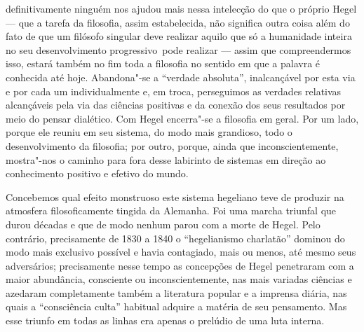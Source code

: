 definitivamente ninguém nos ajudou mais nessa intelecção do que o
próprio Hegel ---
que a tarefa da filosofia, assim estabelecida, não significa outra coisa
além do fato de que um filósofo singular deve realizar aquilo que só a
humanidade inteira no seu desenvolvimento progressivo\est\ pode realizar ---
assim que compreendermos isso, estará também no fim toda a filosofia no
sentido em que a palavra é conhecida até hoje. Abandona"-se a ``verdade
absoluta'', inalcançável por esta via e por cada um individualmente e,
em troca, perseguimos as verdades relativas alcançáveis pela via das
ciências positivas e da conexão dos seus resultados por meio do pensar
dialético.
Com Hegel
encerra"-se a filosofia em geral. Por um lado, porque ele reuniu em seu
sistema, do modo mais grandioso, todo o desenvolvimento da filosofia;
por outro, porque, ainda que inconscientemente, mostra"-nos o caminho
para fora desse labirinto de sistemas em direção ao conhecimento
positivo e efetivo do mundo.

Concebemos qual efeito monstruoso este sistema hegeliano teve de
produzir na atmosfera filosoficamente tingida da Alemanha. Foi uma
marcha triunfal que durou décadas e que de modo nenhum parou com a morte
de Hegel.
Pelo contrário, precisamente de 1830 a 1840 o ``hegelianismo
charlatão'' dominou do modo mais exclusivo possível e 
havia contagiado, mais ou menos, até mesmo seus adversários;
precisamente nesse tempo as concepções
de Hegel penetraram
com a maior abundância, consciente ou inconscientemente, nas mais
variadas ciências e azedaram completamente também a literatura popular e
a imprensa diária, nas quais a ``consciência culta'' habitual adquire a
matéria de seu pensamento. Mas esse triunfo em todas as linhas era
apenas o prelúdio de uma luta interna.

